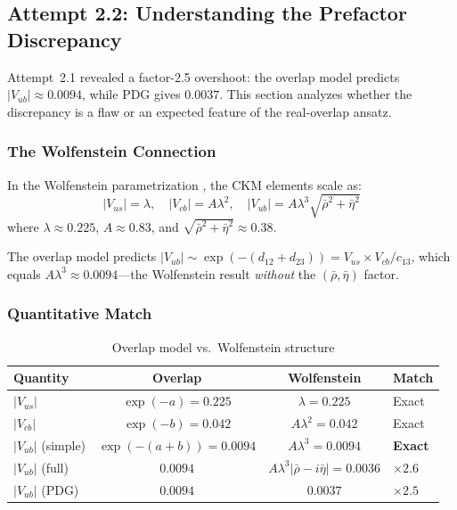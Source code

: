 \subsection{Attempt 2.2: Understanding the Prefactor Discrepancy}
\label{sec:ch7_attempt2_2}

Attempt~2.1 revealed a factor-2.5 overshoot: the overlap model predicts
$|V_{ub}| \approx 0.0094$, while PDG gives $0.0037$. This section analyzes
whether the discrepancy is a flaw or an expected feature of the real-overlap ansatz.

\subsubsection{The Wolfenstein Connection}

In the Wolfenstein parametrization \tagBL{}, the CKM elements scale as:
\begin{equation}
    |V_{us}| = \lambda, \quad
    |V_{cb}| = A\lambda^2, \quad
    |V_{ub}| = A\lambda^3 \sqrt{\bar\rho^2 + \bar\eta^2}
    \label{eq:ch7_wolfenstein_full}
\end{equation}
where $\lambda \approx 0.225$, $A \approx 0.83$, and $\sqrt{\bar\rho^2 + \bar\eta^2} \approx 0.38$.

The overlap model predicts $|V_{ub}| \sim \exp(-(d_{12}+d_{23})) = V_{us} \times V_{cb} / c_{13}$,
which equals $A\lambda^3 \approx 0.0094$---the Wolfenstein result \emph{without}
the $(\bar\rho, \bar\eta)$ factor.

\subsubsection{Quantitative Match}

\begin{table}[ht]
\centering
\caption{Overlap model vs.\ Wolfenstein structure}
\label{tab:ch7_attempt2_2}
\begin{tabular}{lccl}
\toprule
\textbf{Quantity} & \textbf{Overlap} & \textbf{Wolfenstein} & \textbf{Match} \\
\midrule
$|V_{us}|$ & $\exp(-a) = 0.225$ & $\lambda = 0.225$ & Exact \tagCal{} \\
$|V_{cb}|$ & $\exp(-b) = 0.042$ & $A\lambda^2 = 0.042$ & Exact \tagCal{} \\
$|V_{ub}|$ (simple) & $\exp(-(a{+}b)) = 0.0094$ & $A\lambda^3 = 0.0094$ & \textbf{Exact} \tagDc{} \\
$|V_{ub}|$ (full) & $0.0094$ & $A\lambda^3|\bar\rho{-}i\bar\eta| = 0.0036$ & $\times 2.6$ \\
$|V_{ub}|$ (PDG) & $0.0094$ & $0.0037$ & $\times 2.5$ \\
\bottomrule
\end{tabular}
\end{table}

